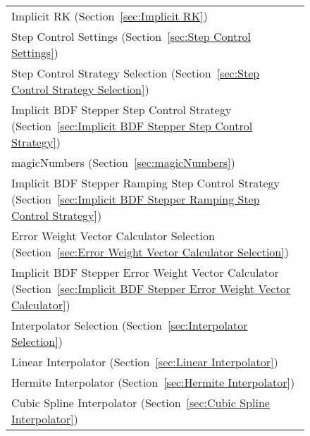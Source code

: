 \begin{figure}
\begin{tabular}{p{}}
\hspace*{0.6in} Implicit RK (Section~\ref{sec:Implicit RK})
    \index{Implicit RK} \\ 
\hspace*{0.4in} Step Control Settings (Section~\ref{sec:Step Control Settings})
    \index{Step Control Settings} \\ 
\hspace*{0.6in} Step Control Strategy Selection (Section~\ref{sec:Step Control Strategy Selection})
    \index{Step Control Strategy Selection} \\ 
\hspace*{0.8in} Implicit BDF Stepper Step Control Strategy (Section~\ref{sec:Implicit BDF Stepper Step Control Strategy})
    \index{Implicit BDF Stepper Step Control Strategy} \\ 
\hspace*{1in} magicNumbers (Section~\ref{sec:magicNumbers})
    \index{magicNumbers} \\ 
\hspace*{0.8in} Implicit BDF Stepper Ramping Step Control Strategy (Section~\ref{sec:Implicit BDF Stepper Ramping Step Control Strategy})
    \index{Implicit BDF Stepper Ramping Step Control Strategy} \\ 
\hspace*{0.6in} Error Weight Vector Calculator Selection (Section~\ref{sec:Error Weight Vector Calculator Selection})
    \index{Error Weight Vector Calculator Selection} \\ 
\hspace*{0.8in} Implicit BDF Stepper Error Weight Vector Calculator (Section~\ref{sec:Implicit BDF Stepper Error Weight Vector Calculator})
    \index{Implicit BDF Stepper Error Weight Vector Calculator} \\ 
\hspace*{0.4in} Interpolator Selection (Section~\ref{sec:Interpolator Selection})
    \index{Interpolator Selection} \\ 
\hspace*{0.6in} Linear Interpolator (Section~\ref{sec:Linear Interpolator})
    \index{Linear Interpolator} \\ 
\hspace*{0.6in} Hermite Interpolator (Section~\ref{sec:Hermite Interpolator})
    \index{Hermite Interpolator} \\ 
\hspace*{0.6in} Cubic Spline Interpolator (Section~\ref{sec:Cubic Spline Interpolator})
    \index{Cubic Spline Interpolator} \\ 

\end{tabular}
\end{figure}
